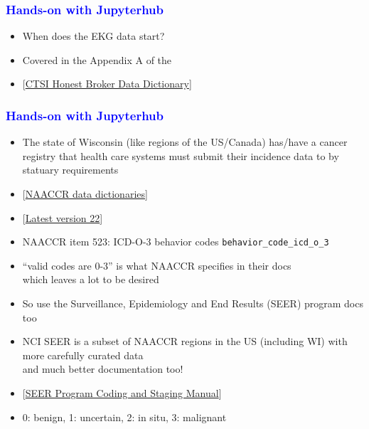 \documentclass[11pt,pdftex,dvipsnames,usenames]{beamer}
\begin{document}
\begin{frame}[fragile]\frametitle{\bf\textcolor{blue}{Hands-on with Jupyterhub}}
\begin{itemize}
\item When does the EKG data start?
\item Covered in the Appendix A of the 
\item \textcolor{PineGreen}{[\href{https://ctri.mcw.edu/wp-content/uploads/CTSI-Honest-Broker-Data-Dictionary.pdf}{CTSI Honest Broker Data Dictionary}]}
\end{itemize}

\end{frame}

\begin{frame}[fragile]\frametitle{\bf\textcolor{blue}{Hands-on with Jupyterhub}}
\begin{itemize}
\item The state of Wisconsin (like regions of the US/Canada) 
has/have a cancer registry that health care systems must
submit their incidence data to by statuary requirements
\item \textcolor{PineGreen}{[\href{https://www.naaccr.org/data-standards-data-dictionary}
{NAACCR data dictionaries}]}
\item 
\textcolor{PineGreen}{[\href{http://datadictionary.naaccr.org/default.aspx?c=10&Version=22}
{Latest version 22}]}
\item NAACCR item 523: ICD-O-3 behavior codes \texttt{behavior\_code\_icd\_o\_3}
\item ``valid codes are 0-3'' is what NAACCR specifies in their docs\\ 
which leaves a lot to be desired
\item So use the Surveillance, Epidemiology
and End Results (SEER) program docs too 
\item NCI SEER is a subset of NAACCR
regions in the US (including WI) with more carefully curated data\\
and much better documentation too!
\item \textcolor{PineGreen}{[\href{https://seer.cancer.gov/manuals/2022/SPCSM_2022_MainDoc.pdf}
{SEER Program Coding and Staging Manual}]}
\item 0: benign, 1: uncertain, 2: in situ, 3: malignant
\end{itemize}
\end{frame}
\end{document}
